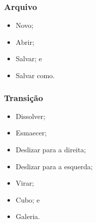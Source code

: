 \documentclass[aspectratio=169]{beamer} %
\begin{document}
\begin{frame}
	\frametitle{Arquivo}
			
	\begin{itemize}
		\item Novo;
		\item Abrir;
		\item Salvar; e
		\item Salvar como.
	\end{itemize}
\end{frame}

\begin{frame}
	\frametitle{Transi\c cão}
			
	\begin{itemize}
		\item Dissolver;
		\item Esmaecer;
		\item Deslizar para a direita;
		\item Deslizar para a esquerda;
		\item Virar;
		\item Cubo; e
		\item Galeria.
	\end{itemize}
\end{frame}
\end{document}

